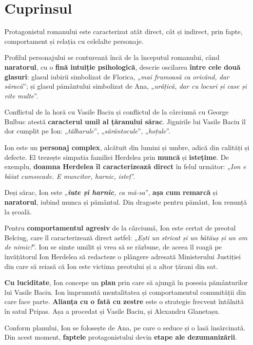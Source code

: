 \documentclass{article}
\newcommand{\qu}[1]{„\emph{#1}”}
\begin{document}
\section{Cuprinsul}
Protagonistul romanului este caracterizat atât direct, cât și indirect, prin fapte, comportament și relația cu celelalte personaje.

Profilul personajului se conturează încă de la începutul romanului, când \textbf{naratorul}, cu o \textbf{fină intuiție psihologică}, descrie oscilarea \textbf{între cele două glasuri}: glasul iubirii simbolizat de Florica, \qu{mai frumoasă ca oricând, dar săracă}; și glasul pământului simbolizat de Ana, \qu{urâțică, dar cu locuri și case și vite multe}.

Conflictul de la horă cu Vasile Baciu și conflictul de la cârciumă cu George Bulbuc atestă \textbf{caracterul umil al țăranului sărac}. Jignirile lui Vasile Baciu îl dor cumplit pe Ion: \qu{tâlharule}, \qu{sărăntocule}, \qu{hoțule}.

Ion este un \textbf{personaj complex}, alcătuit din lumini și umbre, adică din calități și defecte. El trezește simpatia familiei Herdelea prin \textbf{muncă} și \textbf{istețime}. De exemplu, \textbf{doamna Herdelea îl caracterizează direct} în felul următor: \qu{Ion e băiat cumsecade. E muncitor, harnic, isteț}.

Deși sărac, Ion este \qu{\textbf{iute și harnic}, ca mă-sa}, \textbf{așa cum remarcă} și \textbf{naratorul}, iubind munca și pământul. Din dragoste pentru pământ, Ion renunță la școală.

Pentru \textbf{comportamentul agresiv} de la cârciumă, Ion este certat de preotul Belciug, care îl caracterizează direct astfel: \qu{Ești un stricat și un bătăuș și un om de nimic!}. Ion se simte umilit și vrea să se răzbune, de aceea îl roagă pe învățătorul Ion Herdelea să redacteze o plângere adresată Ministerului Justiției din care să reiasă că Ion este victima preotului și a altor țărani din sat.

\textbf{Cu luciditate}, Ion concepe un \textbf{plan} prin care să ajungă în posesia pământurilor lui Vasile Baciu. Ion împrumută mentalitatea și comportamentul comunității din care face parte. \textbf{Alianța cu o fată cu zestre} este o strategie frecvent întâlnită în satul Pripas. Așa a procedat și Vasile Baciu, și Alexandru Glanetașu.

Conform planului, Ion se folosește de Ana, pe care o seduce și o lasă însărcinată. Din acest moment, \textbf{faptele} protagonistului devin \textbf{etape ale dezumanizării}.
\end{document}
